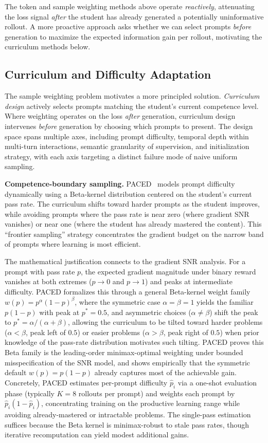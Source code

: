 \documentclass{article} %
\begin{document}
The token and sample weighting methods above operate \emph{reactively}, attenuating the loss signal \emph{after} the student has already generated a potentially uninformative rollout. A more proactive approach asks whether we can select prompts \emph{before} generation to maximize the expected information gain per rollout, motivating the curriculum methods below.

\subsection{Curriculum and Difficulty Adaptation}
\label{subsec:curriculum}

The sample weighting problem motivates a more principled solution. \emph{Curriculum design} actively selects prompts matching the student's current competence level. Where weighting operates on the loss \emph{after} generation, curriculum design intervenes \emph{before} generation by choosing which prompts to present. The design space spans multiple axes, including prompt difficulty, temporal depth within multi-turn interactions, semantic granularity of supervision, and initialization strategy, with each axis targeting a distinct failure mode of naive uniform sampling.

\textbf{Competence-boundary sampling.} PACED~\citep{2603.11178} models prompt difficulty dynamically using a Beta-kernel distribution centered on the student's current pass rate. The curriculum shifts toward harder prompts as the student improves, while avoiding prompts where the pass rate is near zero (where gradient SNR vanishes) or near one (where the student has already mastered the content). This ``frontier sampling'' strategy concentrates the gradient budget on the narrow band of prompts where learning is most efficient.

The mathematical justification connects to the gradient SNR analysis. For a prompt with pass rate $p$, the expected gradient magnitude under binary reward vanishes at both extremes ($p \to 0$ and $p \to 1$) and peaks at intermediate difficulty. PACED formalizes this through a general Beta-kernel weight family $w(p) = p^\alpha(1-p)^\beta$, where the symmetric case $\alpha = \beta = 1$ yields the familiar $p(1-p)$ with peak at $p^* = 0.5$, and asymmetric choices ($\alpha \neq \beta$) shift the peak to $p^* = \alpha/(\alpha + \beta)$, allowing the curriculum to be tilted toward harder problems ($\alpha < \beta$, peak left of $0.5$) or easier problems ($\alpha > \beta$, peak right of $0.5$) when prior knowledge of the pass-rate distribution motivates such tilting. PACED proves this Beta family is the leading-order minimax-optimal weighting under bounded misspecification of the SNR model, and shows empirically that the symmetric default $w(p) = p(1-p)$ already captures most of the achievable gain. Concretely, PACED estimates per-prompt difficulty $\hat{p}_i$ via a one-shot evaluation phase (typically $K{=}8$ rollouts per prompt) and weights each prompt by $\hat{p}_i (1 - \hat{p}_i)$, concentrating training on the productive learning range while avoiding already-mastered or intractable problems. The single-pass estimation suffices because the Beta kernel is minimax-robust to stale pass rates, though iterative recomputation can yield modest additional gains.
\end{document}
